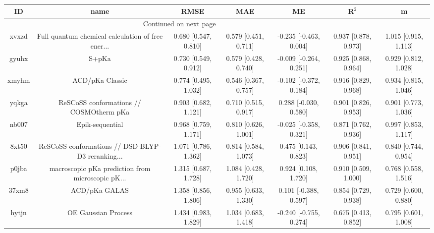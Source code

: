 \documentclass{article}
\begin{document}
\begin{center}
\begin{longtable}{|ccccccc|}
\toprule
    ID &                                               name &                  RMSE &                   MAE &                       ME &                 R$^2$ &                      m \\
\midrule
\endhead
\midrule
\multicolumn{3}{r}{{Continued on next page}} \\
\midrule
\endfoot

\bottomrule
\endlastfoot
 xvxzd &  Full quantum chemical calculation of free ener... &  0.680 [0.547, 0.810] &  0.579 [0.451, 0.711] &   -0.235 [-0.463, 0.004] &  0.937 [0.878, 0.973] &   1.015 [0.915, 1.113] \\
 gyuhx &                                              S+pKa &  0.730 [0.549, 0.912] &  0.579 [0.428, 0.740] &   -0.009 [-0.264, 0.251] &  0.925 [0.868, 0.964] &   0.929 [0.812, 1.028] \\
 xmyhm &                                    ACD/pKa Classic &  0.774 [0.495, 1.032] &  0.546 [0.367, 0.757] &   -0.102 [-0.372, 0.184] &  0.916 [0.829, 0.968] &   0.934 [0.815, 1.046] \\
 yqkga &            ReSCoSS conformations // COSMOtherm pKa &  0.903 [0.682, 1.121] &  0.710 [0.515, 0.917] &    0.288 [-0.030, 0.580] &  0.901 [0.826, 0.953] &   0.901 [0.773, 1.036] \\
 nb007 &                                    Epik-sequential &  0.968 [0.759, 1.171] &  0.810 [0.626, 1.001] &   -0.025 [-0.358, 0.321] &  0.871 [0.762, 0.936] &   0.997 [0.853, 1.117] \\
 8xt50 &  ReSCoSS conformations // DSD-BLYP-D3 reranking... &  1.071 [0.786, 1.362] &  0.814 [0.584, 1.073] &     0.475 [0.143, 0.823] &  0.906 [0.841, 0.951] &   0.840 [0.744, 0.954] \\
 p0jba &  macroscopic pKa prediction from microscopic pK... &  1.315 [0.687, 1.728] &  1.084 [0.428, 1.720] &     0.924 [0.108, 1.720] &  0.910 [0.509, 1.000] &   0.768 [0.558, 1.516] \\
 37xm8 &                                      ACD/pKa GALAS &  1.358 [0.856, 1.806] &  0.955 [0.633, 1.330] &    0.101 [-0.388, 0.597] &  0.854 [0.729, 0.938] &   0.729 [0.600, 0.880] \\
 hytjn &                                OE Gaussian Process &  1.434 [0.983, 1.829] &  1.034 [0.683, 1.418] &   -0.240 [-0.755, 0.274] &  0.675 [0.413, 0.852] &   0.795 [0.601, 1.008] \\

\end{longtable}
\end{center}
\end{document}
